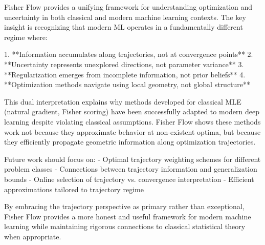 \documentclass[11pt]{article}
\begin{document}
Fisher Flow provides a unifying framework for understanding optimization and uncertainty in both classical and modern machine learning contexts. The key insight is recognizing that modern ML operates in a fundamentally different regime where:

1. **Information accumulates along trajectories, not at convergence points**
2. **Uncertainty represents unexplored directions, not parameter variance**  
3. **Regularization emerges from incomplete information, not prior beliefs**
4. **Optimization methods navigate using local geometry, not global structure**

This dual interpretation explains why methods developed for classical MLE (natural gradient, Fisher scoring) have been successfully adapted to modern deep learning despite violating classical assumptions. Fisher Flow shows these methods work not because they approximate behavior at non-existent optima, but because they efficiently propagate geometric information along optimization trajectories.

Future work should focus on:
- Optimal trajectory weighting schemes for different problem classes
- Connections between trajectory information and generalization bounds
- Online selection of trajectory vs. convergence interpretation
- Efficient approximations tailored to trajectory regime

By embracing the trajectory perspective as primary rather than exceptional, Fisher Flow provides a more honest and useful framework for modern machine learning while maintaining rigorous connections to classical statistical theory when appropriate.
\end{document}
